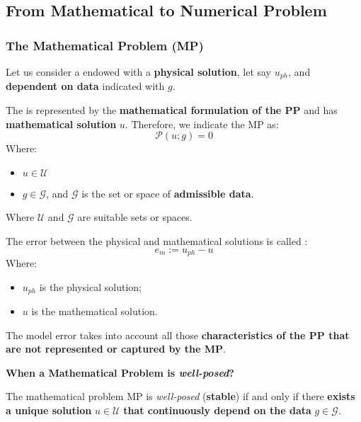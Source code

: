\subsection{From Mathematical to Numerical Problem}

\subsubsection{The Mathematical Problem (MP)}

Let us consider a  endowed with a \textbf{physical solution}, let say $u_{ph}$, and \textbf{dependent on data} indicated with $g$.

\highspace
The  is represented by the \textbf{mathematical formulation of the PP} and has \textbf{mathematical solution} $u$. Therefore, we indicate the MP as:
\begin{equation}\label{eq: mathematical problem (MP)}
    \mathcal{P}\left(u; g\right) = 0
\end{equation}
Where:
\begin{itemize}
    \item $u \in \mathcal{U}$
    \item $g \in \mathcal{G}$, and $\mathcal{G}$ is the set or space of \textbf{admissible data}.
\end{itemize}
Where $\mathcal{U}$ and $\mathcal{G}$ are suitable sets or spaces.

\highspace
\begin{definitionbox}
    The error between the physical and mathematical solutions is called :
    \begin{equation}
        e_{m} := u_{ph} - u
    \end{equation}
    Where:
    \begin{itemize}
        \item $u_{ph}$ is the physical solution;
        \item $u$ is the mathematical solution.
    \end{itemize}
\end{definitionbox}

\noindent
The model error takes into account all those \textbf{characteristics of the PP that are not represented or captured by the MP}.

\highspace
\begin{flushleft}
    \textcolor{Green3}{ \textbf{When a Mathematical Problem is \emph{well-posed}?}}
\end{flushleft}
\begin{definitionbox}
    The mathematical problem MP is \emph{well-posed} (\textbf{stable}) if and only if there \textbf{exists a unique solution} $u \in \mathcal{U}$ \textbf{that continuously depend on the data} $g \in \mathcal{G}$.
\end{definitionbox}


